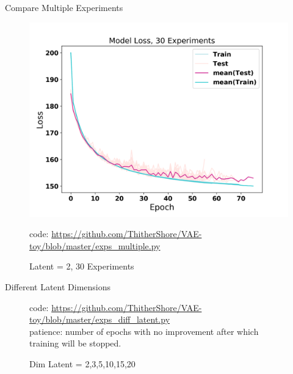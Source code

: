 \documentclass{beamer}
\begin{document}
\begin{frame}{Compare Multiple Experiments}
\begin{figure}
\includegraphics[width=0.7\columnwidth]{fig/loss_30_exps.png}
\caption{Latent = 2, 30 Experiments}
\textcolor[RGB]{185 181 205}{\scriptsize code: \url{https://github.com/ThitherShore/VAE-toy/blob/master/exps\_multiple.py}}
\end{figure}
\end{frame}
\begin{frame}{Different Latent Dimensions}
\begin{figure}[htbp] \centering
{}
\caption{Dim Latent = 2,3,5,10,15,20}
\textcolor[RGB]{185 181 205}{\scriptsize 
code: \url{https://github.com/ThitherShore/VAE-toy/blob/master/exps\_diff\_latent.py}\\
patience: number of epochs with no improvement after which training will be stopped.}
\end{figure}
\end{frame}
\end{document}
